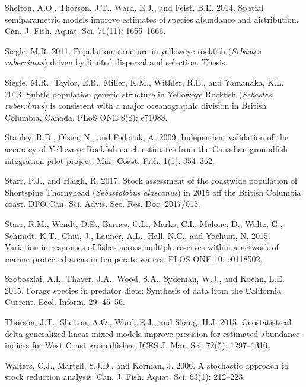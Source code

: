 \documentclass[11pt]{book}
\begin{document}
\leavevmode\hypertarget{ref-shelton2014}{}%
Shelton, A.O., Thorson, J.T., Ward, E.J., and Feist, B.E. 2014. Spatial semiparametric models improve estimates of species abundance and distribution. Can. J. Fish. Aquat. Sci. 71(11): 1655--1666.

\leavevmode\hypertarget{ref-siegle2011}{}%
Siegle, M.R. 2011. Population structure in yelloweye rockfish (\emph{Sebastes ruberrimus}) driven by limited dispersal and selection. Thesis.

\leavevmode\hypertarget{ref-siegle2013}{}%
Siegle, M.R., Taylor, E.B., Miller, K.M., Withler, R.E., and Yamanaka, K.L. 2013. Subtle population genetic structure in Yelloweye Rockfish (\emph{Sebastes ruberrimus}) is consistent with a major oceanographic division in British Columbia, Canada. PLoS ONE 8(8): e71083.

\leavevmode\hypertarget{ref-stanley2009}{}%
Stanley, R.D., Olsen, N., and Fedoruk, A. 2009. Independent validation of the accuracy of Yelloweye Rockfish catch estimates from the Canadian groundfish integration pilot project. Mar. Coast. Fish. 1(1): 354--362.

\leavevmode\hypertarget{ref-starr2017}{}%
Starr, P.J., and Haigh, R. 2017. Stock assessment of the coastwide population of Shortspine Thornyhead (\emph{Sebastolobus alascanus}) in 2015 off the British Columbia coast. DFO Can. Sci. Advis. Sec. Res. Doc. 2017/015.

\leavevmode\hypertarget{ref-starr2015}{}%
Starr, R.M., Wendt, D.E., Barnes, C.L., Marks, C.I., Malone, D., Waltz, G., Schmidt, K.T., Chiu, J., Launer, A.L., Hall, N.C., and Yochum, N. 2015. Variation in responses of fishes across multiple reserves within a network of marine protected areas in temperate waters. PLOS ONE 10: e0118502.

\leavevmode\hypertarget{ref-szoboszlai2015}{}%
Szoboszlai, A.I., Thayer, J.A., Wood, S.A., Sydeman, W.J., and Koehn, L.E. 2015. Forage species in predator diets: Synthesis of data from the California Current. Ecol. Inform. 29: 45--56.

\leavevmode\hypertarget{ref-thorson2015}{}%
Thorson, J.T., Shelton, A.O., Ward, E.J., and Skaug, H.J. 2015. Geostatistical delta-generalized linear mixed models improve precision for estimated abundance indices for West Coast groundfishes. ICES J. Mar. Sci. 72(5): 1297--1310.

\leavevmode\hypertarget{ref-walters2006}{}%
Walters, C.J., Martell, S.J.D., and Korman, J. 2006. A stochastic approach to stock reduction analysis. Can. J. Fish. Aquat. Sci. 63(1): 212--223.
\end{document}

